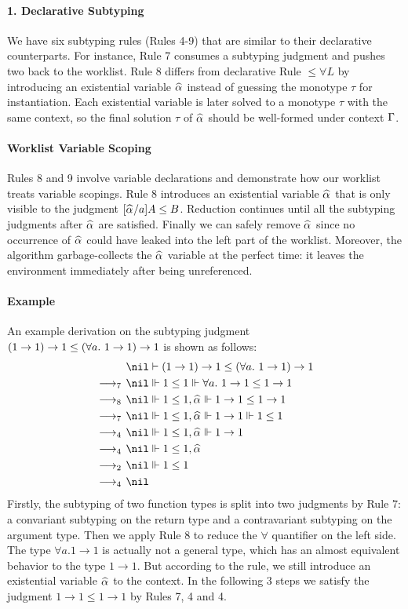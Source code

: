 \paragraph{{\bf 1. Declarative Subtyping}}
We have six subtyping rules (Rules 4-9) that are similar to their
declarative counterparts. For instance, Rule 7 consumes a subtyping
judgment and pushes two back to the worklist.  Rule 8 differs from
declarative Rule ${\le}{\forall}L$ by introducing an existential
variable $\al$ instead of guessing the monotype $\tau$ for
instantiation. Each existential variable is later solved to a
monotype $\tau$ with the same context, so the final solution $\tau$ of
$\al$ should be well-formed under context $\Gamma$.

\paragraph{Worklist Variable Scoping}
Rules 8 and 9 involve variable declarations and demonstrate how our
worklist treats variable scopings. Rule 8 introduces an existential
variable $\al$ that is only visible to the judgment $[\al/a]A \le B$.
Reduction continues until all the subtyping judgments after $\al$
are satisfied.  Finally we can safely remove $\al$ since no occurrence
of $\al$ could have leaked into the left part of the worklist.  Moreover,
the algorithm garbage-collects the $\al$
variable at the perfect time: it leaves the environment immediately
after being unreferenced.

\paragraph{Example} An example derivation on the subtyping judgment
$(1\to 1)\to 1 \le (\all 1\to 1) \to 1$ is shown as follows:
\begin{gather*}
\begin{aligned}
  & \nil\vdash (1\to 1)\to 1 \le (\all 1 \to 1) \to 1\\
\rrule{7}  & \nil \Vdash 1 \le 1 \Vdash \all 1 \to 1 \le 1 \to 1\\
\rrule{8}  & \nil \Vdash 1 \le 1 ,\al \Vdash 1 \to 1 \le 1 \to 1\\
\rrule{7}  & \nil \Vdash 1 \le 1 ,\al \Vdash 1 \to 1 \Vdash 1 \le 1\\
\rrule{4} & \nil \Vdash 1 \le 1 ,\al \Vdash 1 \to 1\\
\rrule{4} & \nil \Vdash 1 \le 1 ,\al\\
\rrule{2} & \nil \Vdash 1 \le 1\\
\rrule{4} & \nil
\end{aligned}
\end{gather*}
Firstly, the subtyping of two function types is split into two judgments by Rule 7:
a convariant subtyping on the return type and a contravariant subtyping on the argument type.
Then we apply Rule 8 to reduce the $\forall$ quantifier on the left side.
The type $\forall a. 1 \to 1$ is actually not a general type, which
has an almost equivalent behavior to the type $1 \to 1$.
But according to the rule, we still introduce an existential variable $\al$ to the context.
In the following 3 steps we satisfy the judgment $1 \to 1 \le 1 \to 1$ by Rules 7, 4 and 4.

